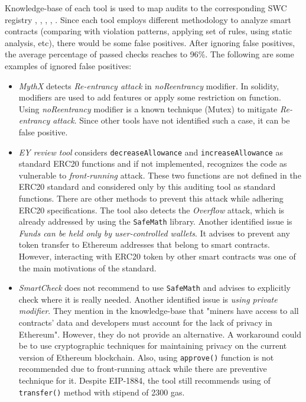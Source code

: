 Knowledge-base of each tool is used to map audits to the corresponding SWC registry \cite{SECURIFYGIT}, \cite{SMARTCHECK}, \cite{MythX}, \cite{ContractGuard}, \cite{SlitherDoc}. Since each tool employs different methodology to analyze smart contracts (\eg comparing with violation patterns, applying set of rules, using static analysis, etc), there would be some false positives. After ignoring false positives, the average percentage of passed checks reaches to 96\%. The following are some examples of ignored false positives:
\begin{itemize}[leftmargin=*]
	\item \textit{MythX} detects \textit{Re-entrancy attack} in \textit{noReentrancy} modifier. In solidity, modifiers are used to add features or apply some restriction on function\cite{SolidityModifer}. Using \textit{noReentrancy} modifier is a known technique (Mutex) to mitigate \textit{Re-entrancy attack}\cite{ReentrancyGuard}. Since other tools have not identified such a case, it can be false positive.
	\item \textit{EY review tool} considers \texttt{decreaseAllowance} and \texttt{increaseAllowance} as standard ERC20 functions and if not implemented, recognizes the code as vulnerable to \textit{front-running} attack. These two functions are not defined in the ERC20 standard\cite{ERC20Std} and considered only by this auditing tool as standard functions. There are other methods to prevent this attack while adhering ERC20 specifications\cite{ERC20MWA}. The tool also detects the \textit{Overflow} attack, which is already addressed by using the \texttt{SafeMath} library. Another identified issue is \textit{Funds can be held only by user-controlled wallets}. It advises to prevent any token transfer to Ethereum addresses that belong to smart contracts. However, interacting with ERC20 token by other smart contracts was one of the main motivations of the standard.
	\item \textit{SmartCheck} does not recommend to use \texttt{SafeMath} and advises to explicitly check where it is really needed. Another identified issue is \textit{using private modifier}. They mention in the knowledge-base that "miners have access to all contracts’ data and developers must account for the lack of privacy in Ethereum". However, they do not provide an alternative. A workaround could be to use cryptographic techniques for maintaining privacy on the current version of Ethereum blockchain. Also, using \texttt{approve()} function is not recommended due to front-running attack while there are preventive technique for it. Despite EIP-1884, the tool still recommends using of \texttt{transfer()} method with stipend of 2300 gas.

\end{itemize}
